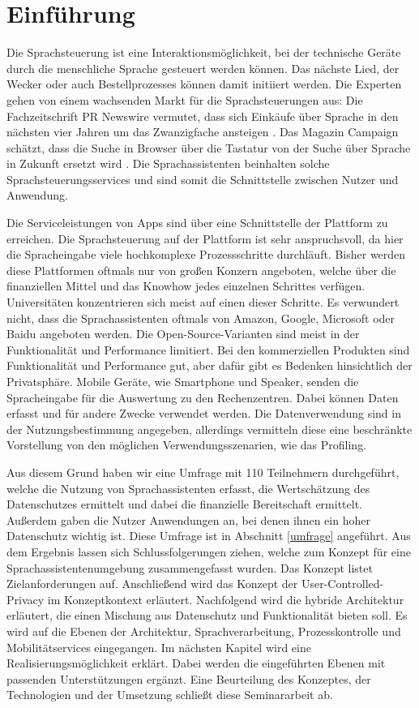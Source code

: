 \section{Einführung}
Die Sprachsteuerung ist eine Interaktionsmöglichkeit, bei der technische Geräte durch die menschliche Sprache gesteuert werden können. Das nächste Lied, der Wecker oder auch Bestellprozesses können damit initiiert werden.  Die Experten gehen von einem wachsenden Markt für die Sprachsteuerungen aus: Die Fachzeitschrift \glqq PR Newswire\grqq{} vermutet, dass sich Einkäufe über Sprache in den nächsten vier Jahren um das Zwanzigfache ansteigen \cite{prNewswire}. Das Magazin \glqq Campaign\grqq{} schätzt, dass die Suche in Browser über die Tastatur von der Suche über Sprache in Zukunft ersetzt wird \cite{Campaign}. Die Sprachassistenten beinhalten solche Sprachsteuerungsservices und sind somit die Schnittstelle zwischen Nutzer und Anwendung. \newline

Die Serviceleistungen von Apps sind über eine Schnittstelle der Plattform zu erreichen. Die Sprachsteuerung auf der Plattform ist sehr anspruchsvoll, da hier die Spracheingabe viele hochkomplexe Prozessschritte durchläuft. Bisher werden diese Plattformen oftmals nur von großen Konzern angeboten, welche über die finanziellen Mittel und das Knowhow jedes einzelnen Schrittes verfügen. Universitäten konzentrieren sich meist auf einen dieser Schritte. Es verwundert nicht, dass die Sprachassistenten oftmals von Amazon, Google, Microsoft oder Baidu angeboten werden. Die Open-Source-Varianten sind meist in der Funktionalität und Performance limitiert. Bei den kommerziellen Produkten sind Funktionalität und Performance gut, aber dafür gibt es Bedenken hinsichtlich der Privatsphäre. Mobile Geräte, wie Smartphone und Speaker, senden die Spracheingabe für die Auswertung zu den Rechenzentren. Dabei können Daten erfasst und für andere Zwecke verwendet werden. Die Datenverwendung sind in der Nutzungsbestimmung angegeben, allerdings vermitteln diese eine beschränkte Vorstellung von den möglichen Verwendungsszenarien, wie das Profiling. 

Aus diesem Grund haben wir eine Umfrage mit 110 Teilnehmern durchgeführt, welche die Nutzung von Sprachassistenten erfasst, die Wertschätzung des Datenschutzes ermittelt und dabei die finanzielle Bereitschaft ermittelt. Außerdem gaben die Nutzer Anwendungen an, bei denen ihnen ein hoher Datenschutz wichtig ist. Diese Umfrage ist in Abschnitt \ref{umfrage} angeführt. Aus dem Ergebnis lassen sich Schlussfolgerungen ziehen, welche zum Konzept für eine Sprachassistentenumgebung zusammengefasst wurden. Das Konzept listet Zielanforderungen auf. Anschließend wird das Konzept der User-Controlled-Privacy im Konzeptkontext erläutert.
Nachfolgend wird die hybride Architektur erläutert, die einen Mischung aus Datenschutz und Funktionalität bieten soll. Es wird auf die Ebenen der Architektur, Sprachverarbeitung, Prozesskontrolle und Mobilitätservices eingegangen.
Im nächsten Kapitel wird eine Realisierungsmöglichkeit erklärt. Dabei werden die eingeführten Ebenen mit passenden Unterstützungen ergänzt. 
Eine Beurteilung des Konzeptes, der Technologien und der Umsetzung schließt diese Seminararbeit ab.
